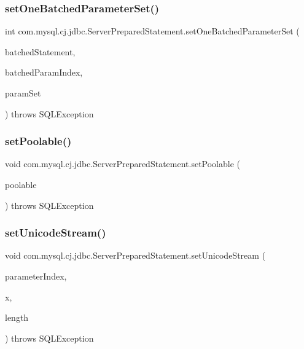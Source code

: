 \subsubsection{\texorpdfstring{set\+One\+Batched\+Parameter\+Set()}{setOneBatchedParameterSet()}}
{\footnotesize\ttfamily int com.\+mysql.\+cj.\+jdbc.\+Server\+Prepared\+Statement.\+set\+One\+Batched\+Parameter\+Set (\begin{DoxyParamCaption}\item[{java.\+sql.\+Prepared\+Statement}]{batched\+Statement,  }\item[{int}]{batched\+Param\+Index,  }\item[{Object}]{param\+Set }\end{DoxyParamCaption}) throws S\+Q\+L\+Exception\hspace{0.3cm}{\ttfamily [protected]}}

\mbox{\label{classcom_1_1mysql_1_1cj_1_1jdbc_1_1_server_prepared_statement_a30b4b80c8969b8f8d99f39cfe9df753f}} 
\subsubsection{\texorpdfstring{set\+Poolable()}{setPoolable()}}
{\footnotesize\ttfamily void com.\+mysql.\+cj.\+jdbc.\+Server\+Prepared\+Statement.\+set\+Poolable (\begin{DoxyParamCaption}\item[{boolean}]{poolable }\end{DoxyParamCaption}) throws S\+Q\+L\+Exception}

\mbox{\label{classcom_1_1mysql_1_1cj_1_1jdbc_1_1_server_prepared_statement_a514b9066383c6b783ce5c7db9cd43e0f}} 
\subsubsection{\texorpdfstring{set\+Unicode\+Stream()}{setUnicodeStream()}}
{\footnotesize\ttfamily void com.\+mysql.\+cj.\+jdbc.\+Server\+Prepared\+Statement.\+set\+Unicode\+Stream (\begin{DoxyParamCaption}\item[{int}]{parameter\+Index,  }\item[{Input\+Stream}]{x,  }\item[{int}]{length }\end{DoxyParamCaption}) throws S\+Q\+L\+Exception}

